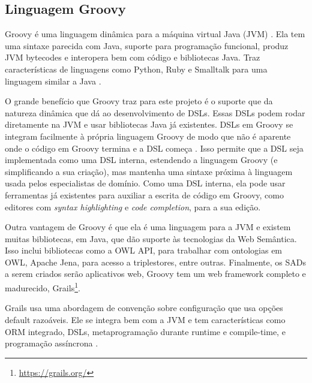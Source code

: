 \subsection*{Linguagem \foreignlanguage{english}{Groovy}}

%
Groovy\foreignlanguage{brazil}{ é uma linguagem dinâmica para a máquina
virtual Java (}JVM\foreignlanguage{brazil}{) \citep{koenig2007groovy}.
Ela tem uma sintaxe parecida com Java, suporte para programação funcional,
produz }JVM bytecodes\foreignlanguage{brazil}{ e interopera bem com
código e bibliotecas Java. Traz características de linguagens como
}Python\foreignlanguage{brazil}{, }Ruby\foreignlanguage{brazil}{ e
}Smalltalk\foreignlanguage{brazil}{ para uma linguagem similar a Java
\citep{koenig2007groovy}.}

%
O grande benefício que \foreignlanguage{english}{Groovy} traz para
este projeto é o suporte que da natureza dinâmica que dá ao desenvolvimento
de DSLs. Essas DSLs podem rodar diretamente na \foreignlanguage{english}{JVM}
e usar bibliotecas Java já existentes. DSLs em \foreignlanguage{english}{Groovy}
se integram facilmente à própria linguagem Groovy de modo que não
é aparente onde o código em \foreignlanguage{english}{Groovy} termina
e a DSL começa \citep{dearle2015groovy}. Isso permite que a DSL
seja implementada como uma DSL interna, estendendo a linguagem Groovy
(e simplificando a sua criação), mas mantenha uma sintaxe próxima
à linguagem usada pelos especialistas de domínio. Como uma DSL interna,
ela pode usar ferramentas já existentes para auxiliar a escrita de
código em Groovy, como editores com \foreignlanguage{english}{\textit{syntax
highlighting}} e \foreignlanguage{english}{\textit{code completion}},
para a sua edição.

Outra vantagem de Groovy é que ela é uma linguagem para a \foreignlanguage{english}{JVM}
e existem muitas bibliotecas, em Java, que dão suporte às tecnologias
da Web Semântica. Isso inclui bibliotecas como a \foreignlanguage{english}{OWL
API}, para trabalhar com ontologias em \foreignlanguage{english}{OWL},
Apache \foreignlanguage{english}{Jena}, para acesso a \foreignlanguage{english}{triplestores},
entre outras. Finalmente, os SADs a serem criados serão aplicativos
web, Groovy tem um web framework completo e madurecido, Grails\foreignlanguage{english}{}\footnote{%
\url{https://grails.org/}%
}. 

Grails usa uma abordagem de convenção sobre configuração que usa opções
default razoáveis. Ele se integra bem com a JVM e tem características
como ORM integrado, DSLs, metaprogramação durante runtime e compile-time,
e programação assíncrona \citep{smith2009grails}.


